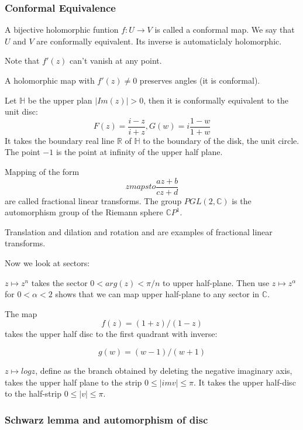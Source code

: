 \documentclass[main.tex]{subfiles}
\begin{document}
\subsubsection{Conformal Equivalence}
A bijective holomorphic funtion $f: U \rightarrow V$ is called a conformal map. We say that $U$ and $V$ are conformally equivalent. Its inverse is automaticlaly holomorphic.

Note that $f'(z)$ can't vanish at any point.

A holomorphic map with $f'(z) \neq 0$ preserves angles (it is conformal).

\begin{example}
Let $\mathbb{H}$ be the upper plan $|Im (z)| > 0$, then it is conformally equivalent to the unit disc:
$$
F(z) = \frac{i -z}{i + z}, G(w) = i \frac{1-w}{1+w}
$$
It takes the boundary real line $\mathbb{R}$ of $\mathbb{H}$ to the boundary of the disk, the unit circle. The point $-1$ is the point at infinity of the upper half plane.
\end{example}

Mapping of the form 
$$
z mapsto \frac{az + b}{cz + d}
$$
are called fractional linear transforms. The group $PGL(2, \mathbb{C})$ is the automorphism group of the Riemann sphere $\mathbb{C}P^1$.

Translation and dilation and rotation and are examples of fractional linear transforms.

Now we look at sectors:

\begin{example}
$z \mapsto z^n$ takes the sector $0 < arg(z) < \pi/n$ to upper half-plane.
Then use $z \mapsto z^\alpha$ for $0 < \alpha < 2$ shows that we can map upper half-plane to any sector in $\mathbb{C}$.
\end{example}

\begin{example}
The map 
$$
f(z) = (1 + z)/(1 -z)
$$
takes the upper half disc to the first quadrant with inverse:

$$
g(w) = (w-1)/(w+1)
$$
\end{example}

\begin{example}
$z \mapsto log z$, define as the branch obtained by deleting the negative imaginary axis, takes the upper half plane to the strip $0 \leq |im v| \leq \pi$. It takes the upper half-disc to the half-strip $0 \leq |v| \leq \pi$.
\end{example}


\subsubsection{Schwarz lemma and automorphism of disc}
\end{document}

